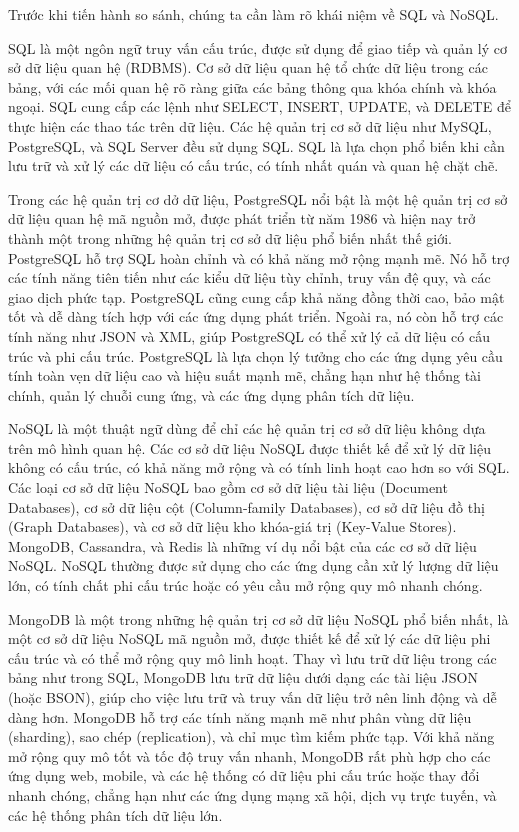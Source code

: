 Trước khi tiến hành so sánh, chúng ta cần làm rõ khái niệm về SQL và NoSQL.

SQL là một ngôn ngữ truy vấn cấu trúc, được sử dụng để giao tiếp và quản lý cơ sở dữ liệu quan hệ (RDBMS). Cơ sở dữ liệu quan hệ tổ chức dữ liệu trong các bảng, với các mối quan hệ rõ ràng giữa các bảng thông qua khóa chính và khóa ngoại. SQL cung cấp các lệnh như SELECT, INSERT, UPDATE, và DELETE để thực hiện các thao tác trên dữ liệu. Các hệ quản trị cơ sở dữ liệu như MySQL, PostgreSQL, và SQL Server đều sử dụng SQL. SQL là lựa chọn phổ biến khi cần lưu trữ và xử lý các dữ liệu có cấu trúc, có tính nhất quán và quan hệ chặt chẽ.

Trong các hệ quản trị cơ dở dữ liệu, PostgreSQL nổi bật là một hệ quản trị cơ sở dữ liệu quan hệ mã nguồn mở, được phát triển từ năm 1986 và hiện nay trở thành một trong những hệ quản trị cơ sở dữ liệu phổ biến nhất thế giới. PostgreSQL hỗ trợ SQL hoàn chỉnh và có khả năng mở rộng mạnh mẽ. Nó hỗ trợ các tính năng tiên tiến như các kiểu dữ liệu tùy chỉnh, truy vấn đệ quy, và các giao dịch phức tạp. PostgreSQL cũng cung cấp khả năng đồng thời cao, bảo mật tốt và dễ dàng tích hợp với các ứng dụng phát triển. Ngoài ra, nó còn hỗ trợ các tính năng như JSON và XML, giúp PostgreSQL có thể xử lý cả dữ liệu có cấu trúc và phi cấu trúc. PostgreSQL là lựa chọn lý tưởng cho các ứng dụng yêu cầu tính toàn vẹn dữ liệu cao và hiệu suất mạnh mẽ, chẳng hạn như hệ thống tài chính, quản lý chuỗi cung ứng, và các ứng dụng phân tích dữ liệu.

NoSQL là một thuật ngữ dùng để chỉ các hệ quản trị cơ sở dữ liệu không dựa trên mô hình quan hệ. Các cơ sở dữ liệu NoSQL được thiết kế để xử lý dữ liệu không có cấu trúc, có khả năng mở rộng và có tính linh hoạt cao hơn so với SQL. Các loại cơ sở dữ liệu NoSQL bao gồm cơ sở dữ liệu tài liệu (Document Databases), cơ sở dữ liệu cột (Column-family Databases), cơ sở dữ liệu đồ thị (Graph Databases), và cơ sở dữ liệu kho khóa-giá trị (Key-Value Stores). MongoDB, Cassandra, và Redis là những ví dụ nổi bật của các cơ sở dữ liệu NoSQL. NoSQL thường được sử dụng cho các ứng dụng cần xử lý lượng dữ liệu lớn, có tính chất phi cấu trúc hoặc có yêu cầu mở rộng quy mô nhanh chóng.

MongoDB là một trong những hệ quản trị cơ sở dữ liệu NoSQL phổ biến nhất, là một cơ sở dữ liệu NoSQL mã nguồn mở, được thiết kế để xử lý các dữ liệu phi cấu trúc và có thể mở rộng quy mô linh hoạt. Thay vì lưu trữ dữ liệu trong các bảng như trong SQL, MongoDB lưu trữ dữ liệu dưới dạng các tài liệu JSON (hoặc BSON), giúp cho việc lưu trữ và truy vấn dữ liệu trở nên linh động và dễ dàng hơn. MongoDB hỗ trợ các tính năng mạnh mẽ như phân vùng dữ liệu (sharding), sao chép (replication), và chỉ mục tìm kiếm phức tạp. Với khả năng mở rộng quy mô tốt và tốc độ truy vấn nhanh, MongoDB rất phù hợp cho các ứng dụng web, mobile, và các hệ thống có dữ liệu phi cấu trúc hoặc thay đổi nhanh chóng, chẳng hạn như các ứng dụng mạng xã hội, dịch vụ trực tuyến, và các hệ thống phân tích dữ liệu lớn.

